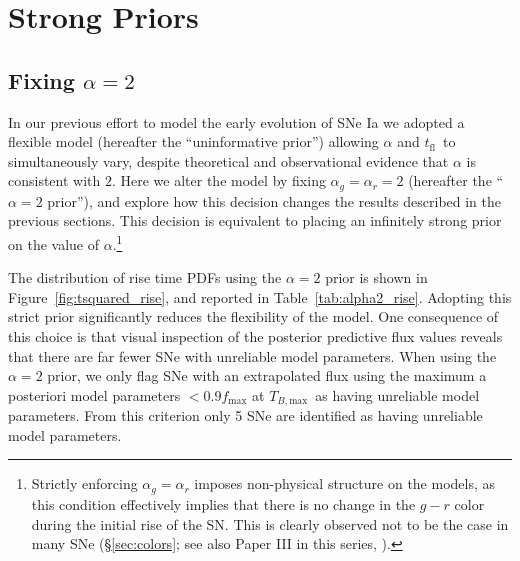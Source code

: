 \documentclass[twocolumn]{aastex63}
\newcommand{\tfl}{$t_\mathrm{fl}$}
\newcommand{\tbmax}{$T_{B,\mathrm{max}}$}
\begin{document}
\section{Strong Priors}\label{sec:strong_priors}

\subsection{Fixing $\alpha = 2$}

In our previous effort to model the early evolution of SNe Ia we adopted a
flexible model (hereafter the ``uninformative prior'') allowing $\alpha$ and
\tfl\ to simultaneously vary, despite theoretical \citep{Arnett82,Riess99a} and
observational \citep{Conley06,Hayden10,Ganeshalingam11} evidence that $\alpha$
is consistent with $2$. Here we alter the model by fixing $\alpha_g = \alpha_r
= 2$ (hereafter the ``$\alpha = 2$ prior''), and explore how this decision
changes the results described in the previous sections. This decision is
equivalent to placing an infinitely strong prior on the value of
$\alpha$.\footnote{Strictly enforcing $\alpha_g = \alpha_r$ imposes
non-physical structure on the models, as this condition effectively implies
that there is no change in the $g - r$ color during the initial rise of the
SN. This is clearly observed not to be the case in many SNe
(\S\ref{sec:colors}; see also Paper III in this series, \citealt{Bulla20}).}

The distribution of rise time PDFs using the $\alpha = 2$ prior is shown in
Figure~\ref{fig:tsquared_rise}, and reported in Table~\ref{tab:alpha2_rise}.
Adopting this strict prior significantly reduces the flexibility of the model.
One consequence of this choice is that visual inspection of the posterior
predictive flux values reveals that there are far fewer SNe with unreliable
model parameters. When using the $\alpha = 2$ prior, we only flag SNe with an
extrapolated flux using the maximum a posteriori model parameters $< 0.9
f_\mathrm{max}$ at \tbmax\ as having unreliable model parameters. From this
criterion only 5 SNe are identified as having unreliable model parameters.


\end{document}
